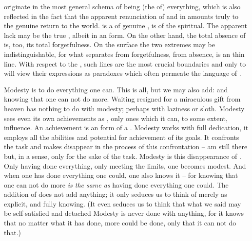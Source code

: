  originate in the most general schema of  being
(the  of) everything, which is also reflected in the fact that the
apparent renunciation of  and  in 
amounts truly to the genuine return to the world.   is a  of
genuine ,  is  of the
spiritual.  %
The apparent lack may be the true , albeit
in an  form.  On the other hand, the total absence of 
is, too, its total forgetfulness. On the surface the two extremes may be
indistinguishable, for what separates  from forgetfulness,
 from absence, is an  thin line. With respect to
the , such lines are the most crucial boundaries and only
 to  will view their expressions as paradoxes
which often permeate the language of . 

\pa Modesty is to do everything one can. This is all, but we may also add: and
knowing that one can not do more.  Waiting resigned for a miraculous gift from
heaven has nothing to do with modesty; perhaps with laziness or sloth.  Modesty
sees even its own achievements as , only ones which it can, to some
extent, influence.  An achievement is an  form of a .
Modesty works with full dedication, it employs all the abilities and potential
for achievement of its goals. It confronts the task and makes  disappear
in the process of this confrontation --  am still there but, in a sense,
only for the sake of the task. Modesty is this disappearance of .
Only having done everything, only meeting the limits, one becomes modest. And
when one has done everything one could, one also knows it -- for knowing that
one can not do more {\em is the same as} having done everything one could. The
addition of   does not add anything; it only seduces us to
think of  merely as explicit,  and fully 
knowing.  (It even seduces us to think that what we said may be self-satisfied
and detached  Modesty is
never done with anything, for it knows that no matter what it has done, more
could be done, only that it can not do that.)

